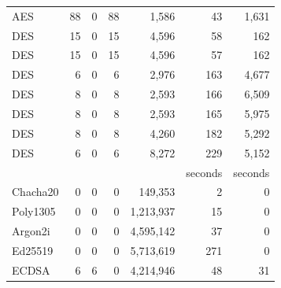 \begin{table}[]
\begin{threeparttable}
\begin{tabular}{l@{}r@{~~}rrr@{~~}rr}
        AES\tnote{8}                & 88                     & 0                   & 88                   & 1,586        & 43      & 1,631        \\
        DES\tnote{1}                & 15                     & 0                   & 15                   & 4,596        & 58      & 162          \\
        DES\tnote{2}                & 15                     & 0                   & 15                   & 4,596        & 57      & 162           \\
        DES\tnote{4}                & 6                      & 0                   & 6                    & 2,976         & 163    & 4,677         \\
        DES\tnote{5}                & 8                      & 0                   & 8                    & 2,593         & 166    & 6,509        \\
        DES\tnote{6}                & 8                      & 0                   & 8                    & 2,593        & 165    & 5,975        \\
        DES\tnote{7}                & 8                      & 0                   & 8                    & 4,260         & 182    & 5,292        \\
        DES\tnote{8}                & 6                      & 0                   & 6                    & 8,272         & 229     & 5,152      \\
                           &                        &                     &                      &                  & seconds   & seconds               \\\cline{6-7}
        Chacha20\tnote{3}           & 0                      & 0                   & 0                    & 149,353        & 2     & 0             \\  
        Poly1305\tnote{3}           & 0                      & 0                   & 0                    & 1,213,937      & 15    & 0             \\
        Argon2i\tnote{3}            & 0                      & 0                   & 0                    & 4,595,142       & 37    & 0             \\
        Ed25519\tnote{3}            & 0                      & 0                   & 0                    & 5,713,619       & 271   & 0            \\
        ECDSA\tnote{2}              & 6                      &    6                & 0                    &  4,214,946     &  48   &   31       \\ 

\end{tabular}
\end{threeparttable}
\end{table}
